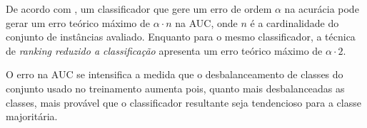 De acordo com \cite{langford08}, um classificador que gere um erro de ordem $\alpha$ na acurácia pode gerar um erro teórico máximo de $\alpha \cdot n$ na AUC, onde $n$ é a cardinalidade do conjunto de instâncias avaliado. Enquanto para o mesmo classificador, a técnica de \emph{ranking reduzido a classificação} apresenta um erro teórico máximo de $\alpha \cdot 2$.

O erro na AUC se intensifica a medida que o desbalanceamento de classes do conjunto usado no treinamento aumenta pois, quanto mais desbalanceadas as classes, mais provável que o classificador resultante seja tendencioso para a classe majoritária.